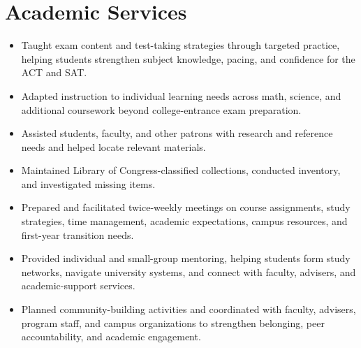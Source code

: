 \section{Academic Services}

\begin{itemize}
  \item Taught exam content and test-taking strategies through targeted practice, helping students strengthen subject knowledge, pacing, and confidence for the ACT and SAT.
  \item Adapted instruction to individual learning needs across math, science, and additional coursework beyond college-entrance exam preparation.
\end{itemize}

\begin{itemize}
  \item Assisted students, faculty, and other patrons with research and reference needs and helped locate relevant materials.
  \item Maintained Library of Congress-classified collections, conducted inventory, and investigated missing items.
\end{itemize}

\begin{itemize}
  \item Prepared and facilitated twice-weekly meetings on course assignments, study strategies, time management, academic expectations, campus resources, and first-year transition needs.
  \item Provided individual and small-group mentoring, helping students form study networks, navigate university systems, and connect with faculty, advisers, and academic-support services.
  \item Planned community-building activities and coordinated with faculty, advisers, program staff, and campus organizations to strengthen belonging, peer accountability, and academic engagement.
\end{itemize}

